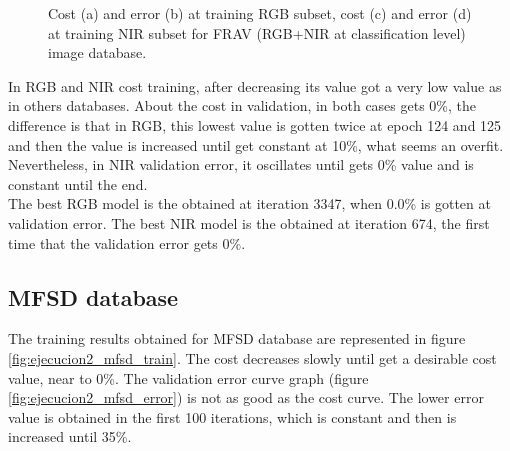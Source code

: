 \begin{figure}[htb]
\caption{Cost (a) and error (b) at training RGB subset, cost (c) and error (d) at training NIR subset for FRAV (RGB+NIR at classification level) image database.}
\label{fig:ejecucion2_frav_clas_train}
\end{figure}

In RGB and NIR cost training, after decreasing its value got a very low value as in others databases. About the cost in validation, in both cases gets 0\%, the difference is that in RGB, this lowest value is gotten twice at epoch 124 and 125 and then the value is increased until get constant at 10\%, what seems an overfit. Nevertheless, in NIR validation error, it oscillates until gets 0\% value and is constant until the end.\\

The best RGB model is the obtained at iteration 3347, when 0.0\% is gotten at validation error. The best NIR model is the obtained at iteration 674, the first time that the validation error gets 0\%.\\

\subsection{MFSD database}
The training results obtained for MFSD database are represented in figure \ref{fig:ejecucion2_mfsd_train}. The cost decreases slowly until get a desirable cost value, near to 0\%. The validation error curve graph (figure \ref{fig:ejecucion2_mfsd_error}) is not as good as the cost curve. The lower error value is obtained in the first 100 iterations, which is constant and then is increased until 35\%.\\

